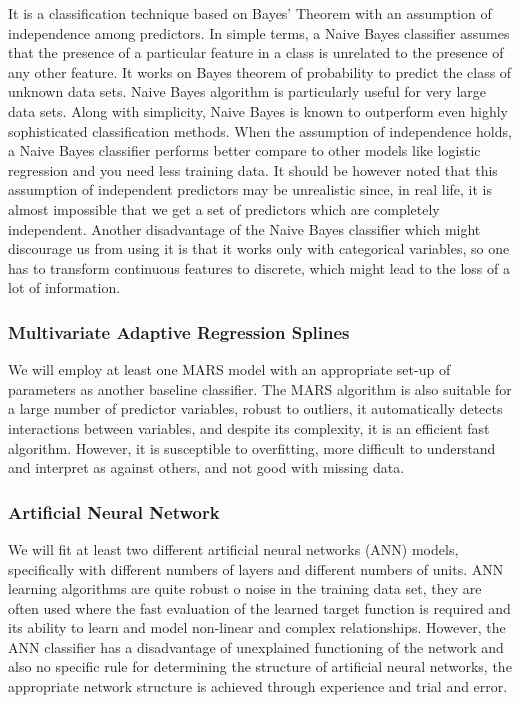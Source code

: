 \documentclass[
  10pt,
]{article}
\begin{document}
It is a classification technique based on Bayes' Theorem with an assumption of independence among predictors. In simple terms, a Naive Bayes classifier assumes that the presence of a particular feature in a class is unrelated to the presence of any other feature. It works on Bayes theorem of probability to predict the class of unknown data sets. Naive Bayes algorithm is particularly useful for very large data sets. Along with simplicity, Naive Bayes is known to outperform even highly sophisticated classification methods. When the assumption of independence holds, a Naive Bayes classifier performs better compare to other models like logistic regression and you need less training data. It should be however noted that this assumption of independent predictors may be unrealistic since, in real life, it is almost impossible that we get a set of predictors which are completely independent. Another disadvantage of the Naive Bayes classifier which might discourage us from using it is that it works only with categorical variables, so one has to transform continuous features to discrete, which might lead to the loss of a lot of information.

\hypertarget{multivariate-adaptive-regression-splines}{%
\subsubsection{Multivariate Adaptive Regression Splines}\label{multivariate-adaptive-regression-splines}}

We will employ at least one MARS model with an appropriate set-up of parameters as another baseline classifier. The MARS algorithm is also suitable for a large number of predictor variables, robust to outliers, it automatically detects interactions between variables, and despite its complexity, it is an efficient fast algorithm. However, it is susceptible to overfitting, more difficult to understand and interpret as against others, and not good with missing data.

\hypertarget{artificial-neural-network}{%
\subsubsection{Artificial Neural Network}\label{artificial-neural-network}}

We will fit at least two different artificial neural networks (ANN) models, specifically with different numbers of layers and different numbers of units. ANN learning algorithms are quite robust o noise in the training data set, they are often used where the fast evaluation of the learned target function is required and its ability to learn and model non-linear and complex relationships. However, the ANN classifier has a disadvantage of unexplained functioning of the network and also no specific rule for determining the structure of artificial neural networks, the appropriate network structure is achieved through experience and trial and error.
\end{document}
